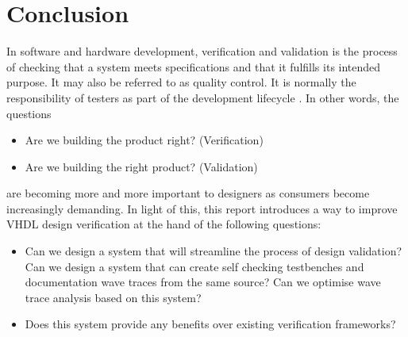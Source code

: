 
\chapter{Conclusion}
In software and hardware development, verification and validation is the process of checking that a system meets specifications and that it fulfills its intended purpose. It may also be referred to as quality control. It is normally the responsibility of testers as part of the development lifecycle \cite{intro:wiki}.\nline
In other words, the questions
\begin{itemize}
	\item Are we building the product right? (Verification)
	\item Are we building the right product? (Validation)
\end{itemize}
are becoming more and more important to designers as consumers become increasingly demanding.
\npar
In light of this, this report introduces a way to improve VHDL design verification at the hand of the following questions:
\begin{itemize}
	\item Can we design a system that will streamline the process of design validation?
	\subitem Can we design a system that can create self checking testbenches and documentation wave traces from the same source?
	\subitem Can we optimise wave trace analysis based on this system?
	\item Does this system provide any benefits over existing verification frameworks?	
\end{itemize}
